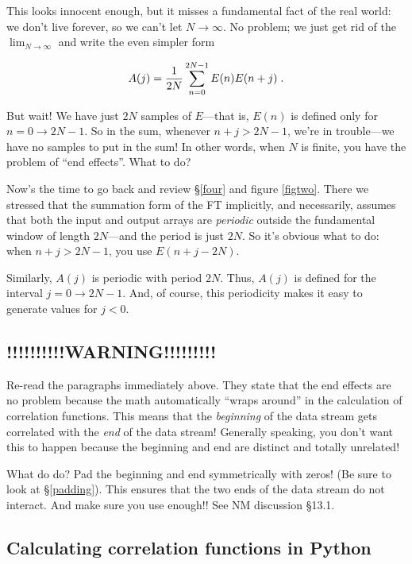 \documentclass[preprint]{aastex}
\begin{document}
        This looks innocent enough, but it misses a fundamental fact of
the real world: we don't live forever, so we can't let $N \rightarrow
\infty$.  No problem; we just get rid of the $\lim_{N \to \infty}$ and  
write the even simpler form

\begin{equation}
A(j) = {1 \over 2N} \sum_{n=0}^{2N-1} E(n) E(n + j) \; .
\end{equation}

\noindent But wait! We have just $2N$ samples of $E$---that is, $E(n)$
is defined only for $n = 0 \rightarrow 2N-1$.  So in the sum, whenever
$n+j > 2N-1$, we're in trouble---we have no samples to put in the sum!
In other words, when $N$ is finite, you have the problem of ``end
effects''.  What to do?

        Now's the time to go back and review \S \ref{four} and figure
\ref{figtwo}. There we stressed that the summation form of the FT
implicitly, and necessarily, assumes that both the input and output
arrays are {\it periodic} outside the fundamental window of length
$2N$---and the period is just $2N$.  So it's obvious what to do: when
$n+j > 2N-1$, you use $E(n+j-2N)$.

        Similarly, $A(j)$ is periodic with period $2N$.  Thus, $A(j)$ is
defined for the interval $j = 0 \rightarrow 2N-1$. And, of course, this
periodicity makes it easy to generate values for $j < 0$.
        
\subsection{!!!!!!!!!!WARNING!!!!!!!!!}

	Re-read the paragraphs immediately above. They state that the
end effects are no problem because the math automatically ``wraps
around'' in the calculation of correlation functions. This means that
the {\it beginning} of the data stream gets correlated with the {\it
end} of the data stream! Generally speaking, you don't want this to
happen because the beginning and end are distinct and totally unrelated!

	What do do? Pad the beginning and end symmetrically with zeros!
(Be sure to look at \S \ref{padding}). This ensures that the two ends of
the data stream do not interact. And make sure you use enough!! See NM
discussion \S 13.1. 

\subsection{Calculating correlation functions in Python}
\end{document}
